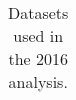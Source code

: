 \begin{table}[h]
\begin{tabular}{|l|l|l|}
		\hline %
		\hline %
	\end{tabular}
	\small
	\caption{ Datasets used in the 2016 analysis. }
	\label{tab:datasets_dataA}
\end{table}


